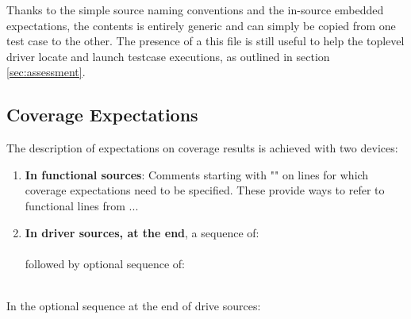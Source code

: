 \documentclass {report}
\begin{document}
Thanks to the simple source naming conventions and the in-source embedded
expectations, the  contents is entirely generic and can simply be
copied from one test case to the other.
%
The presence of a this file is still useful to help the toplevel driver locate
and launch testcase executions, as outlined in section \ref{sec:assessment}.

\subsection{Coverage Expectations}

The description of expectations on coverage results is achieved with two
devices:

\begin{enumerate}
\item \textbf{In functional sources}:
  Comments starting with "\T{-{}- \#}" on lines for which coverage
  expectations need to be specified. These provide ways to refer
  to functional lines from ...

\item \textbf{In driver sources, at the end}, a sequence of:\\

  \\

  followed by optional sequence of:\\

  \\
\end{enumerate}

In the optional sequence at the end of drive sources:
\end{document}
